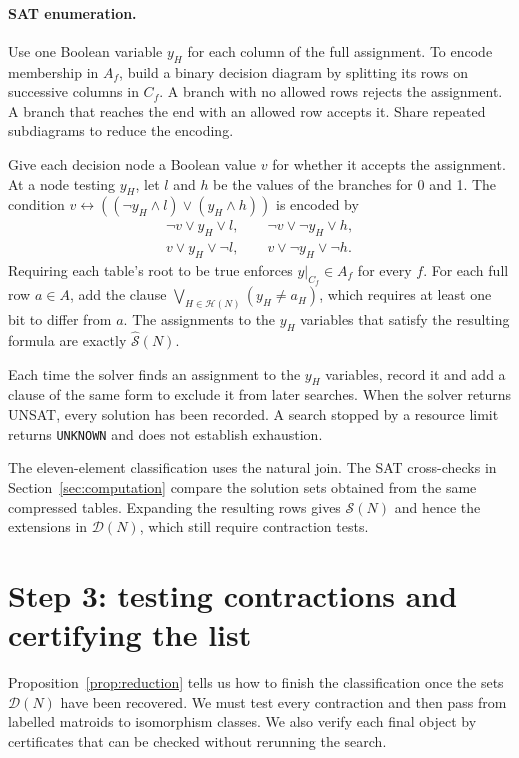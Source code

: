 \documentclass[11pt,a4paper]{article}
\theoremstyle{definition}
\newcommand{\HH}{\mathcal H}
\begin{document}
\paragraph{SAT enumeration.}
Use one Boolean variable $y_H$ for each column of the full
assignment. To encode membership in $A_f$, build a binary
decision diagram by splitting its rows on successive columns
in $C_f$. A branch with no allowed rows rejects the assignment.
A branch that reaches the end with an allowed row accepts it.
Share repeated subdiagrams to reduce the encoding.

Give each decision node a Boolean value $v$ for whether it
accepts the assignment. At a node testing $y_H$, let $l$ and $h$
be the values of the branches for 0 and 1. The condition
$v\leftrightarrow((\neg y_H\land l)\lor(y_H\land h))$ is encoded by
\[
 \begin{gathered}
 \neg v\lor y_H\lor l,\qquad \neg v\lor\neg y_H\lor h,\\
 v\lor y_H\lor\neg l,\qquad v\lor\neg y_H\lor\neg h.
 \end{gathered}
\]
Requiring each table's root to be true enforces
$y|_{C_f}\in A_f$ for every $f$. For each full row $a\in A$,
add the clause $\bigvee_{H\in\HH(N)}(y_H\ne a_H)$, which
requires at least one bit to differ from $a$. The assignments
to the $y_H$ variables that satisfy the resulting formula are
exactly $\widehat{\mathcal S}(N)$.

Each time the solver finds an assignment to the $y_H$ variables,
record it and add a clause of the same form to exclude it from
later searches. When the solver returns UNSAT, every solution has
been recorded. A search stopped by a resource limit returns
\texttt{UNKNOWN} and does not establish exhaustion.

The eleven-element classification uses the natural join.
The SAT cross-checks in Section~\ref{sec:computation} compare
the solution sets obtained from the same compressed tables.
Expanding the resulting rows gives $\mathcal S(N)$ and hence the
extensions in $\mathcal D(N)$, which still require contraction tests.

\section{Step 3: testing contractions and certifying the list}\label{sec:finish}

Proposition~\ref{prop:reduction} tells us how to finish the
classification once the sets $\mathcal D(N)$ have been recovered.
We must test every contraction and then pass from labelled
matroids to isomorphism classes. We also verify each final object
by certificates that can be checked without rerunning the search.
\end{document}

